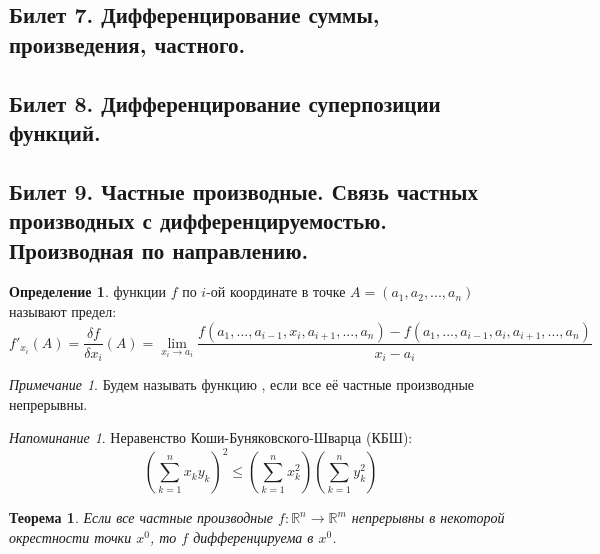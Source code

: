 \documentclass[a4paper]{article}
\theoremstyle{indented}
\newtheorem{theorem}{Теорема}
\theoremstyle{definition}
\newtheorem{defn}{Определение}
\theoremstyle{remark}
\newtheorem{remark}{Примечание}
\newtheorem{remind}{Напоминание}
\begin{document}
\subsection{Билет 7. Дифференцирование суммы, произведения, частного.}

\subsection{Билет 8. Дифференцирование суперпозиции функций.}

\subsection{Билет 9. Частные производные. Связь частных производных с дифференцируемостью. Производная по направлению.}


\begin{defn}
    функции $f$ по $i$-ой координате в точке $A=(a_1, a_2, ..., a_n)$ называют предел:
    $$f'_{x_i}(A) = \frac{\delta f}{\delta x_i} (A) = \lim\limits_{x_i \to a_i} \frac{f(a_1, ..., a_{i-1}, x_i, a_{i+1}, ..., a_n) - f(a_1, ..., a_{i-1}, a_i, a_{i+1}, ..., a_n)}{x_i-a_i}$$
\end{defn}

\begin{remark}
    Будем называть функцию , если все её частные производные непрерывны.
\end{remark}

\begin{remind}
    Неравенство Коши-Буняковского-Шварца (КБШ):
    \[
        \left(\sum\limits_{k=1}^{n}x_k y_k\right)^2 \leq
        \left(\sum\limits_{k=1}^{n}x_k^2\right)
        \left(\sum\limits_{k=1}^{n}y_k^2\right)
    \]
\end{remind}

\begin{theorem}
    Если все частные производные $f: \mathbb{R}^n \to \mathbb{R}^m$ непрерывны в некоторой окрестности точки $x^0$, то $f$ дифференцируема в $x^0$.
\end{theorem}
\end{document}
